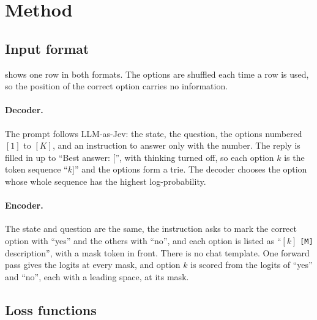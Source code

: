 \section{Method}
\label{sec:method}

\subsection{Input format}
\label{sec:format}

 shows one row in both formats.
The options are shuffled each time a row is used, so the position of the correct option carries no information.

\paragraph{Decoder.}
The prompt follows LLM-as-Jev: the state, the question, the options numbered $[1]$ to $[K]$, and an instruction to answer only with the number.
The reply is filled in up to ``Best answer: ['', with thinking turned off, so each option $k$ is the token sequence ``$k$]'' and the options form a trie.
The decoder chooses the option whose whole sequence has the highest log-probability.

\paragraph{Encoder.}
The state and question are the same, the instruction asks to mark the correct option with ``yes'' and the others with ``no'', and each option is listed as ``$[k]$ \texttt{[M]} description'', with a mask token in front.
There is no chat template.
One forward pass gives the logits at every mask, and option $k$ is scored from the logits of ``yes'' and ``no'', each with a leading space, at its mask.



\subsection{Loss functions}
\label{sec:loss}


